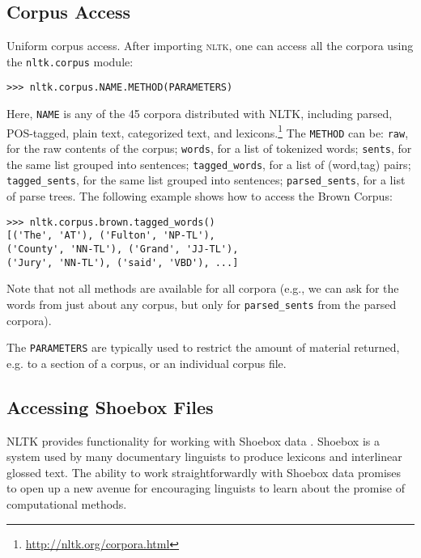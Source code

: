 \documentclass[11pt]{article}
\newcommand{\NLTK}{\textsc{nltk}}
\newcommand{\code}[1]{\texttt{\small #1}}
\begin{document}
\subsection{Corpus Access}

Uniform corpus access.  After importing \NLTK, one can access all the corpora
using the \code{nltk.corpus} module:

{\small
\begin{verbatim}
>>> nltk.corpus.NAME.METHOD(PARAMETERS)
\end{verbatim}}

Here, \code{NAME} is any of the 45 corpora distributed with NLTK, including
parsed, POS-tagged, plain text, categorized text, and lexicons.\footnote{\url{http://nltk.org/corpora.html}}
The \code{METHOD} can be:
\code{raw}, for the raw contents of the corpus;
\code{words}, for a list of tokenized words;
\code{sents}, for the same list grouped into sentences;
\code{tagged\_words}, for a list of (word,tag) pairs;
\code{tagged\_sents}, for the same list grouped into sentences;
\code{parsed\_sents}, for a list of parse trees.
The following example shows how to access the Brown Corpus:

{\small
\begin{verbatim}
>>> nltk.corpus.brown.tagged_words()
[('The', 'AT'), ('Fulton', 'NP-TL'),
('County', 'NN-TL'), ('Grand', 'JJ-TL'),
('Jury', 'NN-TL'), ('said', 'VBD'), ...]
\end{verbatim}}

Note that not all methods are available for all corpora (e.g., we can
ask for the words from just about any corpus, but only for
\code{parsed\_sents} from the parsed corpora).

The \code{PARAMETERS} are typically used to restrict the amount of material returned,
e.g. to a section of a corpus, or an individual corpus file.

\subsection{Accessing Shoebox Files}

NLTK provides functionality for working with Shoebox data
\cite{robinson:etal:2007}. Shoebox is a system used by many
documentary linguists to produce lexicons and interlinear glossed text.  The
ability to work straightforwardly with Shoebox data promises to open
up a new avenue for encouraging linguists to learn about the promise
of computational methods. 
\end{document}
